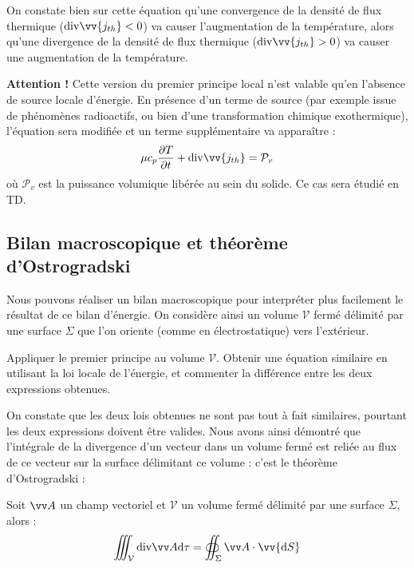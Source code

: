 \documentclass[11pt,fleqn]{book} %
\newcommand{\dd}{\mathrm{d}}
\renewcommand{\div}{\mathrm{div}}
\begin{document}
\begin{remark}
	On constate bien sur cette équation qu'une convergence de la densité de flux thermique ($\div \vv{j_{th}} <0$) va causer l'augmentation de la température, alors qu'une divergence de la densité de flux thermique ($\div \vv{j_{th}} > 0$) va causer une augmentation de la température.
\end{remark}

\textbf{Attention !} Cette version du premier principe local n'est valable qu'en l'absence de source locale d'énergie. En présence d'un terme de source (par exemple issue de phénomènes radioactifs, ou bien d'une transformation chimique exothermique), l'équation sera modifiée et un terme supplémentaire va apparaître :
\begin{equation}
		\mu c_p \frac{\partial T}{\partial t} + \div \vv{j_{th}} = \mathcal{P}_v
\end{equation}
où $\mathcal{P}_v$ est la puissance volumique libérée au sein du solide. Ce cas sera étudié en TD.

\subsection{Bilan macroscopique et théorème d'Ostrogradski}

Nous pouvons réaliser un bilan macroscopique pour interpréter plus facilement le résultat de ce bilan d'énergie. On considère ainsi un volume $\mathcal{V}$ fermé délimité par une surface $\Sigma$ que l'on oriente (comme en électrostatique) vers l'extérieur. 

\begin{capex}
	Appliquer le premier principe au volume $\mathcal{V}$. Obtenir une équation similaire en utilisant la loi locale de l'énergie, et commenter la différence entre les deux expressions obtenues.
\end{capex}

On constate que les deux lois obtenues ne sont pas tout à fait similaires, pourtant les deux expressions doivent être valides. Nous avons ainsi démontré que l'intégrale de la divergence d'un vecteur dans un volume fermé est reliée au flux de ce vecteur sur la surface délimitant ce volume : c'est le théorème d'Ostrogradski :
\begin{theorem}
	Soit $\vv A$ un champ vectoriel et $\mathcal{V}$ un volume fermé délimité par une surface $\Sigma$, alors :
	\begin{equation}
		\iiint_{\mathcal{V}} \div \vv A \dd \tau = \oiint_\Sigma \vv A \cdot \vv{\dd S}
	\end{equation}
\end{theorem}
\end{document}
